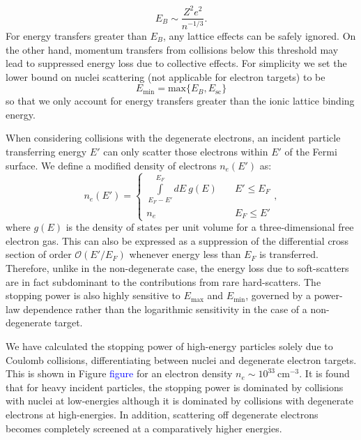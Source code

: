 \documentclass[twocolumn,showpacs,preprintnumbers,amsmath,amssymb,prl]{revtex4}
\begin{document}
\begin{equation}
E_B \sim \frac{Z^2 e^2}{n^{-1/3}}.
\end{equation}
For energy transfers greater than $E_B$, any lattice effects can be safely ignored. On the other hand, momentum transfers from collisions below this threshold may lead to suppressed energy loss due to collective effects. For simplicity we set the lower bound on nuclei scattering (not applicable for electron targets) to be
\begin{equation}
E_{\text{min}} = \text{max} \{E_B,E_{\text{sc}}\}
\end{equation}
so that we only account for energy transfers greater than the ionic lattice binding energy.

When considering collisions with the degenerate electrons, an incident particle transferring energy $E'$ can only scatter those electrons within $E'$ of the Fermi surface. We define a modified density of electrons $n_e(E')$ as:
\begin{equation}
n_e(E') = \left\{
        \begin{array}{ll}
            \displaystyle \int \limits_{E_F -E'}^{E_F}dE ~g(E) & \quad E' \leq E_F \\
            n_e & \quad E_F \leq E'
        \end{array}
    \right.,
\end{equation}
where $g(E)$ is the density of states per unit volume for a three-dimensional free electron gas. This can also be expressed as a suppression of the differential cross section of order $\mathcal{O}(E'/E_F)$ whenever energy less than $E_F$ is transferred. Therefore, unlike in the non-degenerate case, the energy loss due to soft-scatters are in fact subdominant to the contributions from rare hard-scatters. The stopping power is also highly sensitive to $E_{\text{max}}$ and $E_{\text{min}}$, governed by a power-law dependence rather than the logarithmic sensitivity in the case of a non-degenerate target.

We have calculated the stopping power of high-energy particles solely due to Coulomb collisions, differentiating between nuclei and degenerate electron targets. This is shown in Figure \textcolor{blue}{figure} for an electron density $n_e \sim 10^{33} ~\text{cm}^{-3}$. It is found that for heavy incident particles, the stopping power is dominated by collisions with nuclei at low-energies although it is dominated by collisions with degenerate electrons at high-energies. In addition, scattering off degenerate electrons becomes completely screened at a comparatively higher energies.
\end{document}
